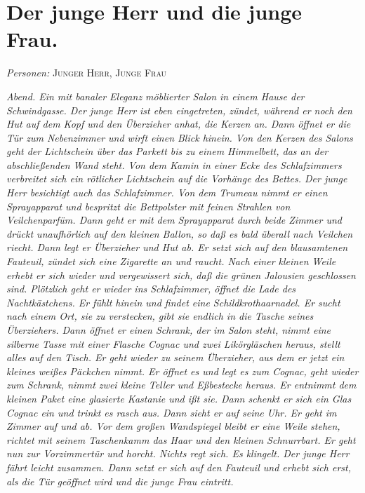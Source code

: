 \documentclass[
	final,
	a4paper,
	ngerman,
	mpinclude = true, %
	twoside = true,
	open = right,
	cleardoublepage = plain,
	DIV = 13,
	BCOR = 1cm,
	titlepage = firstiscover,
	]{scrbook}
\newcommand{\scene}{\section}
\newcommand{\setting}[1]{\vspace{-0.5\baselineskip}\centering\textit{#1}}
\newcommand{\characterlist}[1]{{\begin{center}\textit{Personen:} #1\end{center}}}
\newcommand{\thecharacter}[1]{\textup{\textsc{#1}}}
\newcommand{\theherr}{\thecharacter{Junger Herr}}
\newcommand{\thefrau}{\thecharacter{Junge Frau}}
\begin{document}
\scene{Der junge Herr und die junge Frau.}
\characterlist{\theherr, \thefrau}
\setting{Abend. Ein mit banaler Eleganz möblierter Salon in einem Hause der Schwindgasse. Der junge Herr ist eben eingetreten, zündet, während er noch den Hut auf dem Kopf und den Überzieher anhat, die Kerzen an. Dann öffnet er die Tür zum Nebenzimmer und wirft einen Blick hinein. Von den Kerzen des Salons geht der Lichtschein über das Parkett bis zu einem Himmelbett, das an der abschließenden Wand steht. Von dem Kamin in einer Ecke des Schlafzimmers verbreitet sich ein rötlicher Lichtschein auf die Vorhänge des Bettes. Der junge Herr besichtigt auch das Schlafzimmer. Von dem Trumeau nimmt er einen Sprayapparat und bespritzt die Bettpolster mit feinen Strahlen von Veilchenparfüm. Dann geht er mit dem Sprayapparat durch beide Zimmer und drückt unaufhörlich auf den kleinen Ballon, so daß es bald überall nach Veilchen riecht. Dann legt er Überzieher und Hut ab. Er setzt sich auf den blausamtenen Fauteuil, zündet sich eine Zigarette an und raucht. Nach einer kleinen Weile erhebt er sich wieder und vergewissert sich, daß die grünen Jalousien geschlossen sind. Plötzlich geht er wieder ins Schlafzimmer, öffnet die Lade des Nachtkästchens. Er fühlt hinein und findet eine Schildkrothaarnadel. Er sucht nach einem Ort, sie zu verstecken, gibt sie endlich in die Tasche seines Überziehers. Dann öffnet er einen Schrank, der im Salon steht, nimmt eine silberne Tasse mit einer Flasche Cognac und zwei Likörgläschen heraus, stellt alles auf den Tisch. Er geht wieder zu seinem Überzieher, aus dem er jetzt ein kleines weißes Päckchen nimmt. Er öffnet es und legt es zum Cognac, geht wieder zum Schrank, nimmt zwei kleine Teller und Eßbestecke heraus. Er entnimmt dem kleinen Paket eine glasierte Kastanie und ißt sie. Dann schenkt er sich ein Glas Cognac ein und trinkt es rasch aus. Dann sieht er auf seine Uhr. Er geht im Zimmer auf und ab. Vor dem großen Wandspiegel bleibt er eine Weile stehen, richtet mit seinem Taschenkamm das Haar und den kleinen Schnurrbart. Er geht nun zur Vorzimmertür und horcht. Nichts regt sich. Es klingelt. Der junge Herr fährt leicht zusammen. Dann setzt er sich auf den Fauteuil und erhebt sich erst, als die Tür geöffnet wird und die junge Frau eintritt.}
\end{document}
